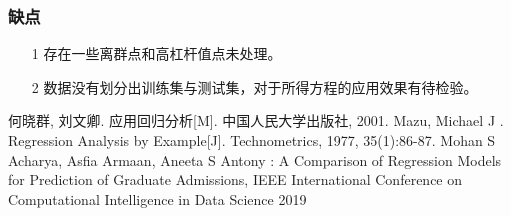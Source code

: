 \documentclass[11pt]{article}
\begin{document}
\subsubsection*{缺点}
\begin{itemize}
\item [1] 存在一些离群点和高杠杆值点未处理。
\item [2] 数据没有划分出训练集与测试集，对于所得方程的应用效果有待检验。
\end{itemize}
\begin{thebibliography}{99}  
	何晓群, 刘文卿. 应用回归分析[M]. 中国人民大学出版社, 2001.  
	Mazu, Michael J . Regression Analysis by Example[J]. Technometrics, 1977, 35(1):86-87.
	Mohan S Acharya, Asfia Armaan, Aneeta S Antony : A Comparison of Regression Models for Prediction of Graduate Admissions, IEEE International Conference on Computational Intelligence in Data Science 2019
\end{thebibliography}
\newpage
{}
\end{document}
